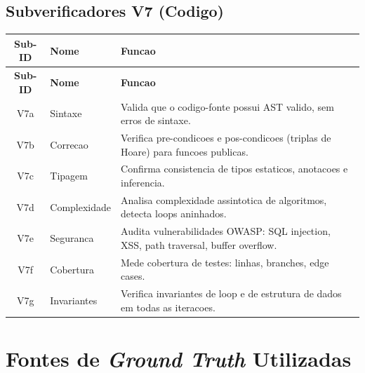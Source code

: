 \subsection{Subverificadores V7 (Codigo)}

\begin{longtable}{|c|l|p{5.5cm}|}
\hline
\textbf{Sub-ID} & \textbf{Nome} & \textbf{Funcao} \\
\hline
\endfirsthead
\hline
\textbf{Sub-ID} & \textbf{Nome} & \textbf{Funcao} \\
\hline
\endhead
\hline
\endfoot
V7a & Sintaxe & Valida que o codigo-fonte possui AST valido, sem erros de sintaxe. \\
\hline
V7b & Correcao & Verifica pre-condicoes e pos-condicoes (triplas de Hoare) para funcoes publicas. \\
\hline
V7c & Tipagem & Confirma consistencia de tipos estaticos, anotacoes e inferencia. \\
\hline
V7d & Complexidade & Analisa complexidade assintotica de algoritmos, detecta loops aninhados. \\
\hline
V7e & Seguranca & Audita vulnerabilidades OWASP: SQL injection, XSS, path traversal, buffer overflow. \\
\hline
V7f & Cobertura & Mede cobertura de testes: linhas, branches, edge cases. \\
\hline
V7g & Invariantes & Verifica invariantes de loop e de estrutura de dados em todas as iteracoes. \\
\hline
\end{longtable}

\newpage

\section{Fontes de \textit{Ground Truth} Utilizadas}

